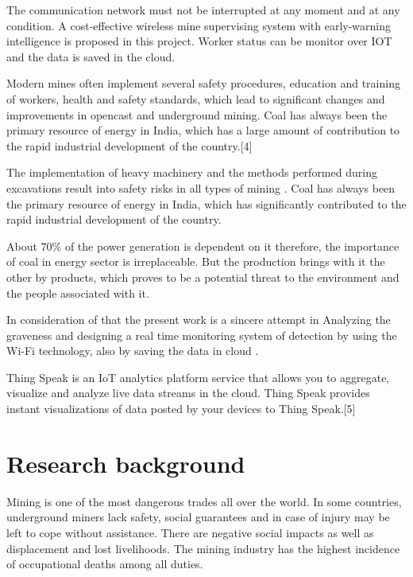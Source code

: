 \documentclass[12pt,a4paper]{report}
\begin{document}
\noindent The communication network must not be interrupted at any moment and at any condition. A cost-effective  wireless mine supervising system with early-warning intelligence is proposed in this project. Worker status can be monitor over IOT and the data is saved in the cloud.

\noindent Modern mines often implement several safety procedures, education and training of workers, health and safety standards, which lead to significant changes and improvements in opencast and underground mining. Coal has always been the primary resource of energy in India, which has a large amount of contribution to the rapid industrial development of the country.[4]

\noindent The implementation of heavy machinery and the methods performed during excavations result into safety risks in all types of mining . Coal has always been the primary resource of energy in India, which has significantly contributed to the rapid industrial development of the country. 

\noindent About 70\% of the power generation is dependent on it therefore, the importance of coal in energy sector is irreplaceable. But the production brings with it the other by products, which proves to be a potential threat to the environment and the people associated with it. 

\noindent In consideration of that the present work is a sincere attempt in  Analyzing the graveness and designing a real time monitoring system of detection by using the Wi-Fi technology, also by saving the data in cloud .

\noindent Thing Speak is an IoT analytics platform service that allows you to aggregate, visualize and analyze live data streams in the cloud. Thing Speak provides instant visualizations of data posted by your devices to Thing Speak.[5]

\noindent 


\section{ Research background}

\noindent Mining is one of the most dangerous trades all over the world. In some countries, underground miners lack safety, social guarantees and in case of injury may be left to cope without assistance. There are negative social impacts as well as displacement and lost livelihoods. The mining industry has the highest incidence of occupational deaths among all duties. 
\end{document}
